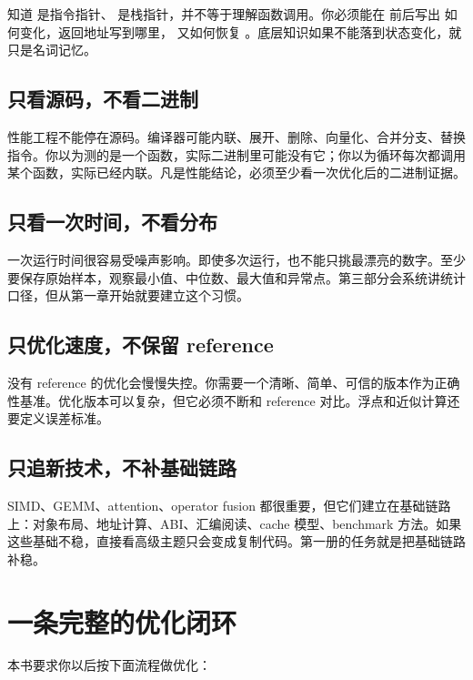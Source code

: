 知道  是指令指针、 是栈指针，并不等于理解函数调用。你必须能在  前后写出  如何变化，返回地址写到哪里， 又如何恢复 。底层知识如果不能落到状态变化，就只是名词记忆。

\subsection{只看源码，不看二进制}

性能工程不能停在源码。编译器可能内联、展开、删除、向量化、合并分支、替换指令。你以为测的是一个函数，实际二进制里可能没有它；你以为循环每次都调用某个函数，实际已经内联。凡是性能结论，必须至少看一次优化后的二进制证据。

\subsection{只看一次时间，不看分布}

一次运行时间很容易受噪声影响。即使多次运行，也不能只挑最漂亮的数字。至少要保存原始样本，观察最小值、中位数、最大值和异常点。第三部分会系统讲统计口径，但从第一章开始就要建立这个习惯。

\subsection{只优化速度，不保留 reference}

没有 reference 的优化会慢慢失控。你需要一个清晰、简单、可信的版本作为正确性基准。优化版本可以复杂，但它必须不断和 reference 对比。浮点和近似计算还要定义误差标准。

\subsection{只追新技术，不补基础链路}

SIMD、GEMM、attention、operator fusion 都很重要，但它们建立在基础链路上：对象布局、地址计算、ABI、汇编阅读、cache 模型、benchmark 方法。如果这些基础不稳，直接看高级主题只会变成复制代码。第一册的任务就是把基础链路补稳。

\section{一条完整的优化闭环}

本书要求你以后按下面流程做优化：

